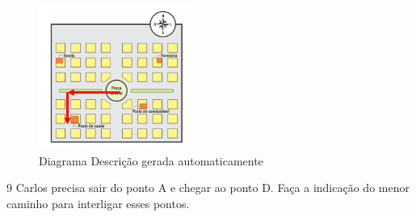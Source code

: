\begin{escolha}
\begin{boxmedio}
\begin{boxmedio}
{\begin{boxpeq}
\begin{boxpeq}
{\begin{boxpeq}
\begin{boxmedio}
\begin{boxmedio}
\begin{boxpeq}
\begin{boxmedio}
\begin{boxpeq}
\begin{boxpeq}
\begin{boxpeq}
\begin{boxpeq}
\begin{boxmedio}
{\begin{boxmedio}
\begin{boxmedio}
\begin{boxpeq}
\begin{boxmedio}
\begin{boxpeq}
\begin{boxpeq}
\begin{boxpeq}
\begin{escolha}
{\begin{boxmedio}
\begin{boxpeq}
\begin{boxpeq}
\begin{boxpeq}
\begin{boxpeq}
\begin{boxpeq}
\begin{boxmedio}
\begin{boxpeq}
\begin{boxpeq}
\begin{boxpeq}
{\begin{boxpeq}
\begin{boxmedio}
\begin{boxpeq}
\begin{boxpeq}
\begin{boxpeq}
{\begin{boxpeq}
\begin{boxmedio}
{\begin{boxpeq}
\begin{boxpeq}
\begin{boxmedio}
\begin{boxmedio}
\begin{boxpeq}
\begin{boxpeq}
{\begin{boxpeq}
\begin{boxpeq}
\begin{boxpeq}
\begin{boxpeq}
\begin{boxpeq}
\begin{escolha}
\begin{escolha}
{\begin{boxmedio}
\begin{boxpeq}
\begin{q°}
\begin{boxmedio}
\begin{boxpeq}
\begin{boxpeq}
\begin{boxmedio}
\begin{boxmedio}
\begin{boxmedio}
{\begin{figure}
\centering
\includegraphics[width=1.95139in,height=1.84648in]{./_SAEB_9_MAT/media/image208.png}
\caption{Diagrama Descrição gerada automaticamente}
\end{figure}
}

\num{9} Carlos precisa sair do ponto A e chegar ao ponto D. Faça a indicação
do menor caminho para interligar esses pontos.


\end{boxmedio}
\end{boxmedio}
\end{boxmedio}
\end{boxpeq}
\end{boxpeq}
\end{boxmedio}
\end{q°}
\end{boxpeq}
\end{boxmedio}}
\end{escolha}
\end{escolha}
\end{boxpeq}
\end{boxpeq}
\end{boxpeq}
\end{boxpeq}
\end{boxpeq}}
\end{boxpeq}
\end{boxpeq}
\end{boxmedio}
\end{boxmedio}
\end{boxpeq}
\end{boxpeq}}
\end{boxmedio}
\end{boxpeq}}
\end{boxpeq}
\end{boxpeq}
\end{boxpeq}
\end{boxmedio}
\end{boxpeq}}
\end{boxpeq}
\end{boxpeq}
\end{boxpeq}
\end{boxmedio}
\end{boxpeq}
\end{boxpeq}
\end{boxpeq}
\end{boxpeq}
\end{boxpeq}
\end{boxmedio}}
\end{escolha}
\end{boxpeq}
\end{boxpeq}
\end{boxpeq}
\end{boxmedio}
\end{boxpeq}
\end{boxmedio}
\end{boxmedio}}
\end{boxmedio}
\end{boxpeq}
\end{boxpeq}
\end{boxpeq}
\end{boxpeq}
\end{boxmedio}
\end{boxpeq}
\end{boxmedio}
\end{boxmedio}
\end{boxpeq}}
\end{boxpeq}
\end{boxpeq}}
\end{boxmedio}
\end{boxmedio}
\end{escolha}

